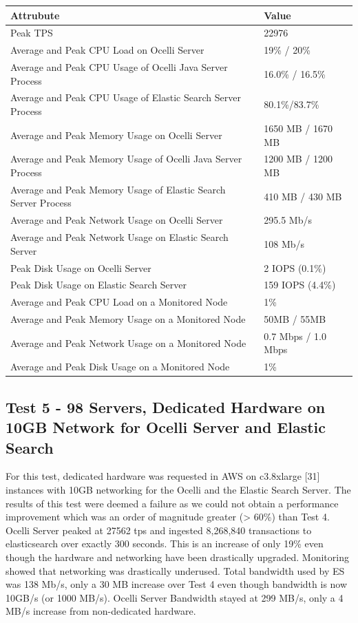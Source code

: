 \documentclass{llncs}
\begin{document}
\begin{flushleft}
    \begin{tabular}{ | l | l |}
    \hline
  Attrubute & Value  \\ \hline
  Peak TPS & 22976  \\ \hline
  Average and Peak CPU Load on Ocelli Server &19\% / 20\%  \\ \hline
  Average and Peak CPU Usage of Ocelli Java Server Process & 16.0\% / 16.5\% \\ \hline
 Average and Peak CPU Usage of Elastic Search Server Process & 80.1\%/83.7\%	  \\ \hline
  Average and Peak Memory Usage on Ocelli Server & 1650 MB / 1670 MB	 \\ \hline
  Average and Peak Memory Usage of Ocelli Java Server Process &	1200 MB / 1200 MB		 \\ \hline
 Average and Peak Memory Usage of Elastic Search Server Process &	410 MB / 430 MB		 \\ \hline
Average and Peak Network Usage on Ocelli Server &	295.5 Mb/s 	 \\ \hline
Average and Peak Network Usage on Elastic Search Server & 108 Mb/s 	 \\ \hline
Peak Disk Usage on Ocelli Server &	2 IOPS (0.1\%)		 \\ \hline
Peak Disk Usage on Elastic Search Server &	159 IOPS (4.4\%)		 \\ \hline
Average and Peak CPU Load on a Monitored Node& 	1\% 	 \\ \hline
  Average and Peak Memory Usage on a Monitored Node &	50MB / 55MB	 \\ \hline
Average and Peak Network Usage on a Monitored Node &	0.7 Mbps / 1.0 Mbps		 \\ \hline
  Average and Peak Disk Usage on a Monitored Node &  1\%	\\ 
    \hline
    \end{tabular}
\end{flushleft}

\subsection{Test 5 - 98 Servers, Dedicated Hardware on 10GB Network for Ocelli Server and Elastic Search }

For this test, dedicated hardware was requested in AWS on c3.8xlarge [31] instances with 10GB networking for the Ocelli and the Elastic Search Server. The results of this test were deemed a failure as we could not obtain a performance improvement which was an order of magnitude greater (> 60\%) than Test 4. Ocelli Server peaked at 27562 tps and ingested 8,268,840 transactions to elasticsearch over exactly 300 seconds. This is an increase of only 19\% even though the hardware and networking have been drastically upgraded. Monitoring showed that networking was drastically underused. Total bandwidth used by ES was 138 Mb/s, only a 30 MB increase over Test 4 even though bandwidth is now 10GB/s (or 1000 MB/s). Ocelli Server Bandwidth stayed at 299 MB/s, only a 4 MB/s increase from non-dedicated hardware.
\end{document}
